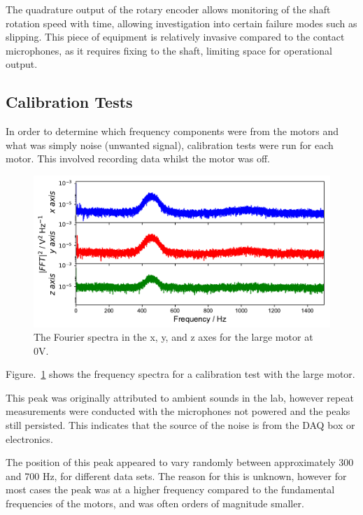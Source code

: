 The quadrature output of the rotary encoder allows monitoring of the shaft rotation speed with time, allowing investigation into certain failure modes such as slipping. This piece of equipment is relatively invasive compared to the contact microphones, as it requires fixing to the shaft, limiting space for operational output. 

\subsection{Calibration Tests}

In order to determine which frequency components were from the motors and what was simply noise (unwanted signal), calibration tests were run for each motor. This involved recording data whilst the motor was off. 

\begin{figure}[t]
    \includegraphics[width=1.0\textwidth]{fig/freq_large_0V.pdf}
    \caption[Calibration Frequency 1]{The Fourier spectra in the x, y, and z axes for the large motor at 0V.}
    \label{fig:freq_large0V}
\end{figure}

Figure.~\ref{fig:freq_large0V} shows the frequency spectra for a calibration test with the large motor. 

This peak was originally attributed to ambient sounds in the lab, however repeat measurements were conducted with the microphones not powered and the peaks still persisted. This indicates that the source of the noise is from the DAQ box or electronics. 

The position of this peak appeared to vary randomly between approximately 300 and 700 Hz, for different data sets. The reason for this is unknown, however for most cases the peak was at a higher frequency compared to the fundamental frequencies of the motors, and was often orders of magnitude smaller. 

